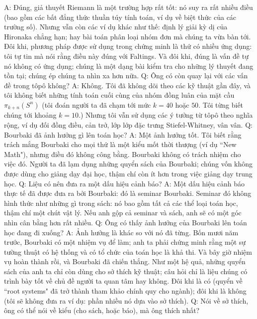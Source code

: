 \begin{multicols}{2}
	\vskip 0.1cm
	A: Đúng, giả thuyết Riemann là một trường hợp rất tốt: nó suy ra rất nhiều điều (bao gồm các bất đẳng thức thuần túy tính toán, ví dụ về biệt thức của các trường số). Nhưng vẫn còn các ví dụ khác như thế: định lý giải kỳ dị của Hironaka chẳng hạn; hay bài toán phân loại nhóm đơn mà chúng ta vừa bàn tới.
	\vskip 0.1cm
	Đôi khi, phương pháp được sử dụng trong chứng minh là thứ có nhiều ứng dụng: tôi tự tin mà nói rằng điều này đúng với Faltings. Và đôi khi, đúng là vấn đề tự nó không có ứng dụng; chúng là một dạng bài kiểm tra cho những lý thuyết đang tồn tại; chúng ép chúng ta nhìn xa hơn nữa.
	\vskip 0.1cm
	Q: Ông có còn quay lại với các vấn đề trong tôpô không?
	\vskip 0.1cm
	A: Không. Tôi đã không dõi theo các kỹ thuật gần đây, và tôi không biết những tính toán cuối cùng của nhóm đồng luân của mặt cầu $\pi_{k+n}(S^n)$ (tôi đoán người ta đã chạm tới mức $k=40$ hoặc $50$. Tôi từng biết chúng tới khoảng $k=10$.)
	\vskip 0.1cm
	Nhưng tôi vẫn sử dụng các ý tưởng từ tôpô theo nghĩa rộng, ví dụ đối đồng điều, cản trở, lớp lớp đặc trưng Stiefel-Whitney, vân vân.
	\vskip 0.1cm
	Q: Bourbaki đã ảnh hưởng gì lên toán học?
	\vskip 0.1cm
	A: Một ảnh hưởng tốt. Tôi biết rằng trách mắng Bourbaki cho mọi thứ là một kiểu mốt thời thượng (ví dụ ``New Math"), nhưng điều đó không công bằng. Bourbaki không có trách nhiệm cho việc đó. Người ta đã lạm dụng những quyển sách của Bourbaki; chúng vốn không được dùng cho giảng dạy đại học, thậm chí còn ít hơn trong việc giảng dạy trung học. 
	\vskip 0.1cm
	Q: Liệu có nên đưa ra một dấu hiệu cảnh báo?
	\vskip 0.1cm
	A: Một dấu hiệu cảnh báo thực tế đã được đưa ra bởi Bourbaki: đó là seminar Bourbaki. Seminar đó không hình thức như những gì trong sách: nó bao gồm tất cả các thể loại toán học, thậm chí một chút vật lý. Nếu anh gộp cả seminar và sách, anh sẽ có một góc nhìn cân bằng hơn rất nhiều.
	\vskip 0.1cm
	Q: Ông có thấy ảnh hưởng của Bourbaki lên toán học đang đi xuống?
	\vskip 0.1cm
	A: Ảnh hưởng là khác so với nó đã từng. Bốn mươi năm trước, Bourbaki có một nhiệm vụ để làm; anh ta phải chứng minh rằng một sự tường thuật có hệ thống và có tổ chức của toán học là khả thi. Và bây giờ nhiệm vụ hoàn thành rồi, và Bourbaki đã chiến thắng. Như một hệ quả, những quyển sách của anh ta chỉ còn dùng cho sở thích kỹ thuật; câu hỏi chỉ là liệu chúng có trình bày tốt về chủ đề người ta quan tâm hay không. Đôi khi là có (quyển về ``root systems" đã trở thành tham khảo chính quy cho ngành); đôi khi là không (tôi sẽ không đưa ra ví dụ: phần nhiều nó dựa vào sở thích).
	\vskip 0.1cm
	Q: Nói về sở thích, ông có thể nói về kiểu (cho sách, hoặc báo), mà ông thích nhất?

\end{multicols}
